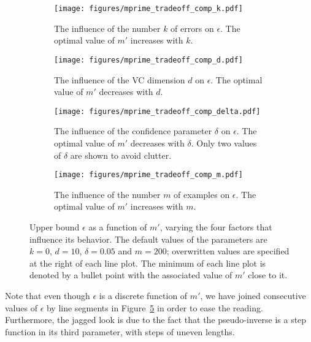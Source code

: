 \documentclass[twoside,11pt]{article}
\begin{document}
\begin{figure}[h!]
\centering
\begin{subfigure}[t]{0.485\textwidth}
    \centering
    \texttt{[image: figures/mprime\_tradeoff\_comp\_k.pdf]}
    \caption{The influence of the number $k$ of errors on $\epsilon$. The optimal value of $m'$ increases with $k$.}
    \label{fig:comp_k}
\end{subfigure}\hfill
\begin{subfigure}[t]{0.485\textwidth}
    \centering
    \texttt{[image: figures/mprime\_tradeoff\_comp\_d.pdf]}
    \caption{The influence of the VC dimension $d$ on $\epsilon$. The optimal value of $m'$ decreases with $d$.}
    \label{fig:comp_d}
\end{subfigure}

\vspace{10pt}

\begin{subfigure}[t]{0.485\textwidth}
    \centering
    \texttt{[image: figures/mprime\_tradeoff\_comp\_delta.pdf]}
    \caption{The influence of the confidence parameter $\delta$ on $\epsilon$. The optimal value of $m'$ decreases with $\delta$. Only two values of $\delta$ are shown to avoid clutter.}
    \label{fig:comp_delta}
\end{subfigure}\hfill
\begin{subfigure}[t]{0.485\textwidth}
    \centering
    \texttt{[image: figures/mprime\_tradeoff\_comp\_m.pdf]}
    \caption{The influence of the number $m$ of examples on $\epsilon$. The optimal value of $m'$ increases with $m$.}
    \label{fig:comp_m}
\end{subfigure}
\caption{Upper bound $\epsilon$ as a function of $m'$, varying the four factors that influence its behavior.
The default values of the parameters are $k=0$, $d=10$, $\delta=0.05$ and $m=200$; overwritten values are specified at the right of each line plot.
The minimum of each line plot is denoted by a bullet point with the associated value of $m'$ close to it.}
\label{fig:bound_comp}
\end{figure}

Note that even though $\epsilon$ is a discrete function of $m'$, we have joined consecutive values of $\epsilon$ by line segments in Figure~\ref{fig:bound_comp} in order to ease the reading. 
Furthermore, the jagged look is due to the fact that the pseudo-inverse is a step function in its third parameter, with steps of uneven lengths.
\end{document}

